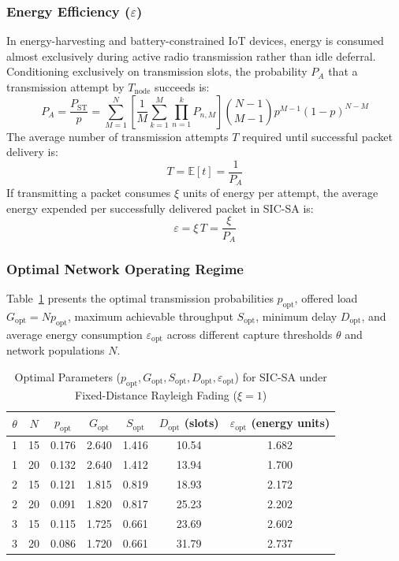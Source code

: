 \subsubsection{Energy Efficiency ($\varepsilon$)}
In energy-harvesting and battery-constrained IoT devices, energy is consumed almost exclusively during active radio transmission rather than idle deferral. Conditioning exclusively on transmission slots, the probability $P_A$ that a transmission attempt by $T_{\text{node}}$ succeeds is:
\begin{equation}
    P_A = \frac{P_{\text{ST}}}{p} = \sum_{M=1}^N \left[ \frac{1}{M} \sum_{k=1}^M \prod_{n=1}^k P_{n,M} \right] \binom{N - 1}{M - 1} p^{M - 1} (1 - p)^{N - M}
\end{equation}
The average number of transmission attempts $T$ required until successful packet delivery is:
\begin{equation}
    T = \mathbb{E}[t] = \frac{1}{P_A}
\end{equation}
If transmitting a packet consumes $\xi$ units of energy per attempt, the average energy expended per successfully delivered packet in SIC-SA is:
\begin{equation}
    \varepsilon = \xi \, T = \frac{\xi}{P_A}
\end{equation}

\subsubsection{Optimal Network Operating Regime}
Table~\ref{tab:sic_optimal_params} presents the optimal transmission probabilities $p_{\text{opt}}$, offered load $G_{\text{opt}} = N p_{\text{opt}}$, maximum achievable throughput $S_{\text{opt}}$, minimum delay $D_{\text{opt}}$, and average energy consumption $\varepsilon_{\text{opt}}$ across different capture thresholds $\theta$ and network populations $N$.

\begin{table}[htbp]
\centering
\caption{Optimal Parameters ($p_{\text{opt}}, G_{\text{opt}}, S_{\text{opt}}, D_{\text{opt}}, \varepsilon_{\text{opt}}$) for SIC-SA under Fixed-Distance Rayleigh Fading ($\xi = 1$)}
\label{tab:sic_optimal_params}
\begin{tabular}{ccccccc}
\toprule
$\theta$ & $N$ & $p_{\text{opt}}$ & $G_{\text{opt}}$ & $S_{\text{opt}}$ & $D_{\text{opt}}$ (slots) & $\varepsilon_{\text{opt}}$ (energy units) \\
\midrule
1 & 15 & 0.176 & 2.640 & 1.416 & 10.54 & 1.682 \\
1 & 20 & 0.132 & 2.640 & 1.412 & 13.94 & 1.700 \\
2 & 15 & 0.121 & 1.815 & 0.819 & 18.93 & 2.172 \\
2 & 20 & 0.091 & 1.820 & 0.817 & 25.23 & 2.202 \\
3 & 15 & 0.115 & 1.725 & 0.661 & 23.69 & 2.602 \\
3 & 20 & 0.086 & 1.720 & 0.661 & 31.79 & 2.737 \\
\bottomrule
\end{tabular}
\end{table}

